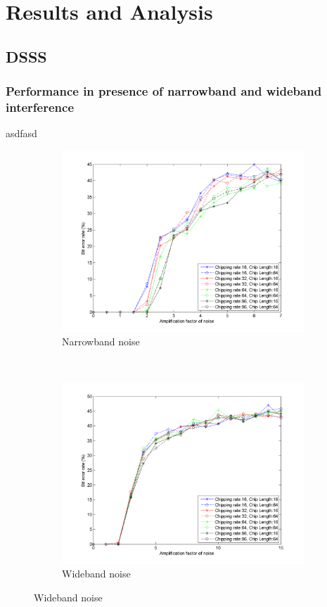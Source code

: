 \section{Results and Analysis}

	\subsection{DSSS}
	
		\subsubsection{Performance in presence of narrowband and wideband interference}
		asdfasd		
		\begin{figure}[H]
			\centering
		    \begin{subfigure}[b]{0.5\textwidth}
				\includegraphics[width=\textwidth]{imgs/results/plot_mode_dsss-test_narrowband-rep_20-dataRate_8-dataLength_128.png}
				\caption{Narrowband noise}
				\label{fig:dsss_narrowband}
			\end{subfigure}%
			~
			\begin{subfigure}[b]{0.5\textwidth}
				\includegraphics[width=\textwidth]{imgs/results/plot_mode_dsss-test_wideband-rep_20-dataRate_8-dataLength_128.png}
				\caption{Wideband noise}
				\label{fig:dsss_wideband}
			\end{subfigure}
		\end{figure}
		
